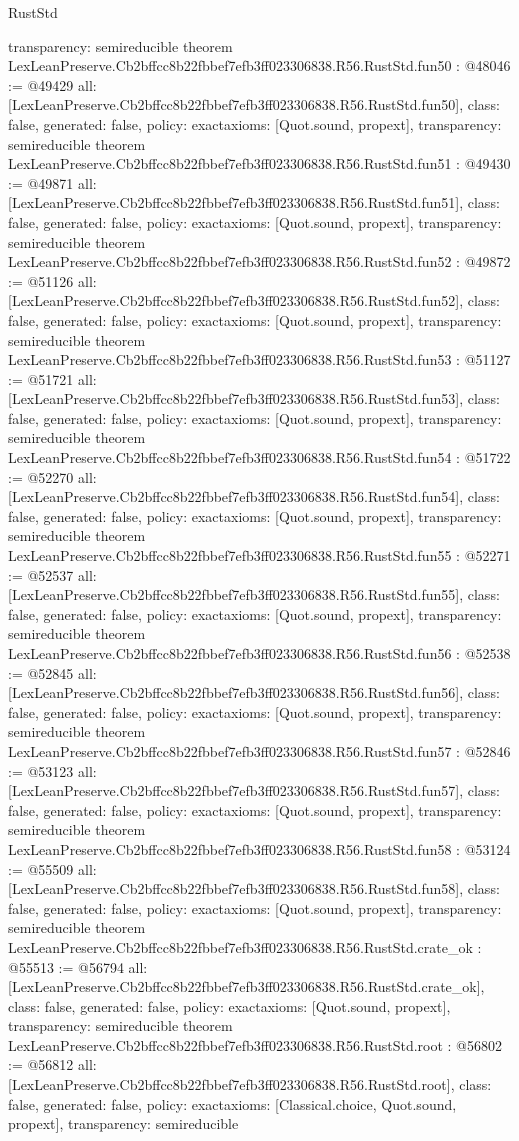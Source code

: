 \begin{lexlean}{RustStd}
\begin{coremodule}
{  transparency: semireducible
}
theorem LexLeanPreserve.Cb2bffcc8b22fbbef7efb3ff023306838.R56.RustStd.fun50 : @48046 := @49429 {
  all: [LexLeanPreserve.Cb2bffcc8b22fbbef7efb3ff023306838.R56.RustStd.fun50],
  class: false,
  generated: false,
  policy: exact{axioms: [Quot.sound, propext]},
  transparency: semireducible
}
theorem LexLeanPreserve.Cb2bffcc8b22fbbef7efb3ff023306838.R56.RustStd.fun51 : @49430 := @49871 {
  all: [LexLeanPreserve.Cb2bffcc8b22fbbef7efb3ff023306838.R56.RustStd.fun51],
  class: false,
  generated: false,
  policy: exact{axioms: [Quot.sound, propext]},
  transparency: semireducible
}
theorem LexLeanPreserve.Cb2bffcc8b22fbbef7efb3ff023306838.R56.RustStd.fun52 : @49872 := @51126 {
  all: [LexLeanPreserve.Cb2bffcc8b22fbbef7efb3ff023306838.R56.RustStd.fun52],
  class: false,
  generated: false,
  policy: exact{axioms: [Quot.sound, propext]},
  transparency: semireducible
}
theorem LexLeanPreserve.Cb2bffcc8b22fbbef7efb3ff023306838.R56.RustStd.fun53 : @51127 := @51721 {
  all: [LexLeanPreserve.Cb2bffcc8b22fbbef7efb3ff023306838.R56.RustStd.fun53],
  class: false,
  generated: false,
  policy: exact{axioms: [Quot.sound, propext]},
  transparency: semireducible
}
theorem LexLeanPreserve.Cb2bffcc8b22fbbef7efb3ff023306838.R56.RustStd.fun54 : @51722 := @52270 {
  all: [LexLeanPreserve.Cb2bffcc8b22fbbef7efb3ff023306838.R56.RustStd.fun54],
  class: false,
  generated: false,
  policy: exact{axioms: [Quot.sound, propext]},
  transparency: semireducible
}
theorem LexLeanPreserve.Cb2bffcc8b22fbbef7efb3ff023306838.R56.RustStd.fun55 : @52271 := @52537 {
  all: [LexLeanPreserve.Cb2bffcc8b22fbbef7efb3ff023306838.R56.RustStd.fun55],
  class: false,
  generated: false,
  policy: exact{axioms: [Quot.sound, propext]},
  transparency: semireducible
}
theorem LexLeanPreserve.Cb2bffcc8b22fbbef7efb3ff023306838.R56.RustStd.fun56 : @52538 := @52845 {
  all: [LexLeanPreserve.Cb2bffcc8b22fbbef7efb3ff023306838.R56.RustStd.fun56],
  class: false,
  generated: false,
  policy: exact{axioms: [Quot.sound, propext]},
  transparency: semireducible
}
theorem LexLeanPreserve.Cb2bffcc8b22fbbef7efb3ff023306838.R56.RustStd.fun57 : @52846 := @53123 {
  all: [LexLeanPreserve.Cb2bffcc8b22fbbef7efb3ff023306838.R56.RustStd.fun57],
  class: false,
  generated: false,
  policy: exact{axioms: [Quot.sound, propext]},
  transparency: semireducible
}
theorem LexLeanPreserve.Cb2bffcc8b22fbbef7efb3ff023306838.R56.RustStd.fun58 : @53124 := @55509 {
  all: [LexLeanPreserve.Cb2bffcc8b22fbbef7efb3ff023306838.R56.RustStd.fun58],
  class: false,
  generated: false,
  policy: exact{axioms: [Quot.sound, propext]},
  transparency: semireducible
}
theorem LexLeanPreserve.Cb2bffcc8b22fbbef7efb3ff023306838.R56.RustStd.crate_ok : @55513 := @56794 {
  all: [LexLeanPreserve.Cb2bffcc8b22fbbef7efb3ff023306838.R56.RustStd.crate_ok],
  class: false,
  generated: false,
  policy: exact{axioms: [Quot.sound, propext]},
  transparency: semireducible
}
theorem LexLeanPreserve.Cb2bffcc8b22fbbef7efb3ff023306838.R56.RustStd.root : @56802 := @56812 {
  all: [LexLeanPreserve.Cb2bffcc8b22fbbef7efb3ff023306838.R56.RustStd.root],
  class: false,
  generated: false,
  policy: exact{axioms: [Classical.choice, Quot.sound, propext]},
  transparency: semireducible
}


\end{coremodule}
\end{lexlean}
